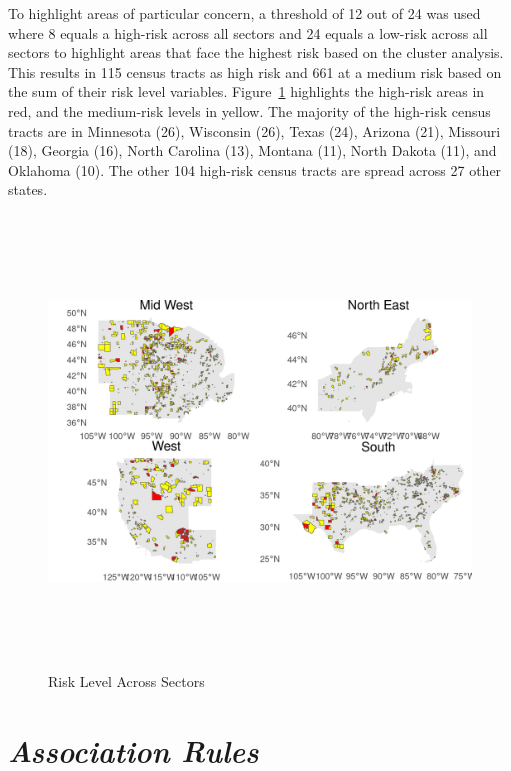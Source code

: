  To highlight areas of particular concern, a threshold of 12 out of 24 was used where 8 equals a high-risk across all sectors and 24 equals a low-risk across all sectors to highlight areas that face the highest risk based on the cluster analysis. This results in 115 census tracts as high risk and 661 at a medium risk based on the sum of their risk level variables. Figure~\ref{fig:regional_risk_map} highlights the high-risk areas in red, and the medium-risk levels in yellow. The majority of the high-risk census tracts are in Minnesota (26), Wisconsin (26), Texas (24), Arizona (21), Missouri (18), Georgia (16), North Carolina (13), Montana (11), North Dakota (11), and Oklahoma (10). The other 104 high-risk census tracts are spread across 27 other states. 

 \begin{figure}[htbp]
    \centering
     \includegraphics[width=\textwidth, height=12cm]{plots/regional_risk_map.png}
     \caption{Risk Level Across Sectors}
     \label{fig:regional_risk_map}
 \end{figure}

\section{\textit{Association Rules}}

